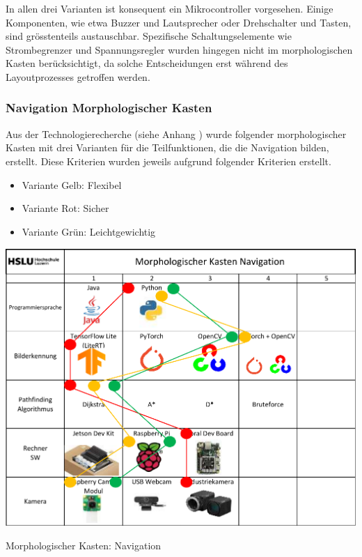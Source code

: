 In allen drei Varianten ist konsequent ein Mikrocontroller vorgesehen. Einige Komponenten, wie etwa Buzzer und Lautsprecher oder Drehschalter und Tasten, sind grösstenteils austauschbar. Spezifische Schaltungselemente wie Strombegrenzer und Spannungsregler wurden hingegen nicht im morphologischen Kasten berücksichtigt, da solche Entscheidungen erst während des Layoutprozesses getroffen werden.


\subsubsection*{Navigation Morphologischer Kasten}


Aus der Technologierecherche (siehe Anhang ) wurde folgender morphologischer Kasten mit drei Varianten für die Teilfunktionen, die die Navigation bilden, erstellt.  Diese Kriterien wurden jeweils aufgrund folgender Kriterien erstellt.

\begin{itemize}
    \item Variante Gelb: Flexibel
    \item Variante Rot: Sicher
    \item Variante Grün: Leichtgewichtig
\end{itemize}

\begin{table}[H]
\centering
\includegraphics[width=\textwidth]{assets/MK_Informatik.pdf}
\caption{Morphologischer Kasten: Navigation}
\label{table:mk-informatik}
\end{table}


